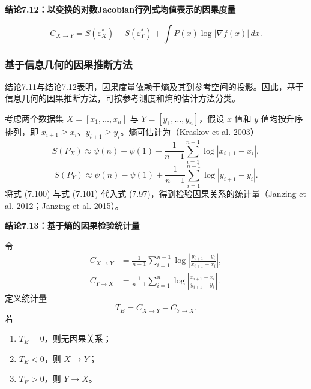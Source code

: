 \par\medskip{}\noindent\textbf{结论7.12：以变换的对数Jacobian行列式均值表示的因果度量}\par
\begin{equation}
C_{X\to Y}=S(\varepsilon_X^*)-S(\varepsilon_Y^*)
+\int P(x)\log|\nabla f(x)|\,dx.
\tag{7.99}
\end{equation}

\subsubsection{基于信息几何的因果推断方法}
结论7.11与结论7.12表明，因果度量依赖于熵及其到参考空间的投影。因此，基于信息几何的因果推断方法，可按参考测度和熵的估计方法分类。

考虑两个数据集 $X=[x_1,\ldots,x_n]$ 与 $Y=[y_1,\ldots,y_n]$，假设 $x$ 值和 $y$ 值均按升序排列，即 $x_{i+1}\ge x_i$、$y_{i+1}\ge y_i$。熵可估计为（Kraskov et al. 2003）
\begin{equation}
S(P_X)\approx\psi(n)-\psi(1)+\frac1{n-1}\sum_{i=1}^{n-1}\log|x_{i+1}-x_i|,
\tag{7.100}
\end{equation}
\begin{equation}
S(P_Y)\approx\psi(n)-\psi(1)+\frac1{n-1}\sum_{i=1}^{n-1}\log|y_{i+1}-y_i|.
\tag{7.101}
\end{equation}
将式 (7.100) 与式 (7.101) 代入式 (7.97)，得到检验因果关系的统计量（Janzing et al. 2012；Janzing et al. 2015）。

\par\medskip{}\noindent\textbf{结论7.13：基于熵的因果检验统计量}\par
令
\[
\begin{aligned}
C_{X\to Y}&=\frac1{n-1}\sum_{i=1}^{n-1}\log\left|\frac{y_{i+1}-y_i}{x_{i+1}-x_i}\right|,\\
C_{Y\to X}&=\frac1{n-1}\sum_{i=1}^{n}\log\left|\frac{x_{i+1}-x_i}{y_{i+1}-y_i}\right|.
\end{aligned}
\]
定义统计量
\begin{equation}
T_E=C_{X\to Y}-C_{Y\to X}.
\tag{7.102}
\end{equation}
若
\begin{enumerate}
\item $T_E=0$，则无因果关系；
\item $T_E<0$，则 $X\to Y$；
\item $T_E>0$，则 $Y\to X$。
\end{enumerate}

